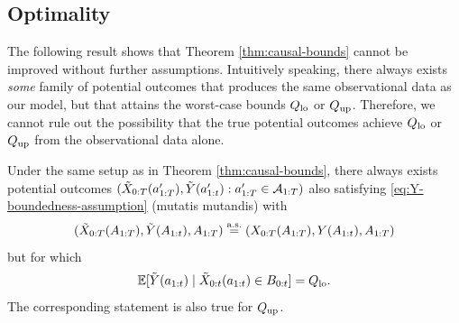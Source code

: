 \subsection{Optimality}

The following result shows that Theorem \ref{thm:causal-bounds} cannot be improved without further assumptions. 
Intuitively speaking, there always exists \emph{some} family of potential outcomes that produces the same observational data as our model, but that attains the worst-case bounds $Q_{\mathrm{lo}}$ or $Q_{\mathrm{up}}$.
Therefore, we cannot rule out the possibility that the true potential outcomes achieve $Q_{\mathrm{lo}}$ or $Q_{\mathrm{up}}$ from the observational data alone.

\begin{proposition} \label{prop:sharpness-of-bounds}
    Under the same setup as in Theorem \ref{thm:causal-bounds}, there always exists potential outcomes $(\tilde{X}_{0:T}(a_{1:T}'), \tilde{Y}(a_{1:t}') : a_{1:T}' \in \mathcal{A}_{1:T})$ also satisfying \eqref{eq:Y-boundedness-assumption} (mutatis mutandis) with 
    $$(\tilde{X}_{0:T}(A_{1:T}), \tilde{Y}(A_{1:t}), A_{1:T}) \overset{\mathrm{a.s.}}{=} (X_{0:T}(A_{1:T}), Y(A_{1:t}), A_{1:T})$$ 
    but for which $$\mathbb{E}[\tilde{Y}(a_{1:t}) \mid \tilde{X}_{0:t}(a_{1:t}) \in B_{0:t}] = Q_{\mathrm{lo}}.$$
    The corresponding statement is also true for $Q_{\mathrm{up}}$.
\end{proposition}

